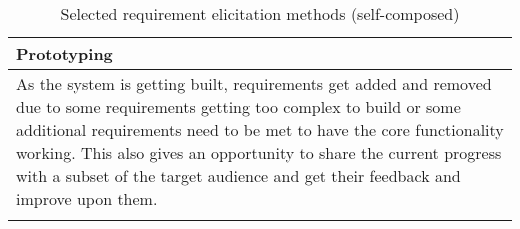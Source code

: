 \begin{longtable}{|p{160mm}|}
\textbf{Prototyping} \\ \hline
As the system is getting built, requirements get added and removed due to some requirements getting too complex to build or some additional requirements need to be met to have the core functionality working. This also gives an opportunity to share the current progress with a subset of the target audience and get their feedback and improve upon them. \\ \hline

\caption{Selected requirement elicitation methods (self-composed)}
\end{longtable}

